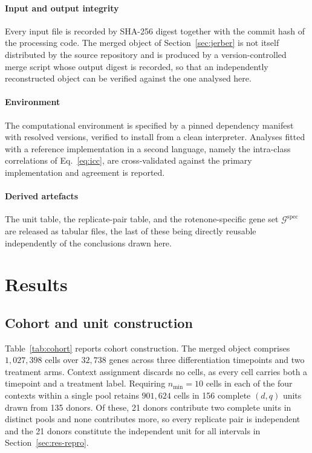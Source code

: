 \documentclass[5p,times,twocolumn]{elsarticle}
\begin{document}
\paragraph{\textbf{Input and output integrity}} Every input file is recorded by
SHA-256 digest together with the commit hash of the processing code. The merged
object of Section~\ref{sec:jerber} is not itself distributed by the source
repository and is produced by a version-controlled merge script whose output
digest is recorded, so that an independently reconstructed object can be
verified against the one analysed here.

\paragraph{\textbf{Environment}} The computational environment is specified by a
pinned dependency manifest with resolved versions, verified to install from a
clean interpreter. Analyses fitted with a reference implementation in a second
language, namely the intra-class correlations of Eq.~\eqref{eq:icc}, are
cross-validated against the primary implementation and agreement is reported.

\paragraph{\textbf{Derived artefacts}} The unit table, the replicate-pair table,
and the rotenone-specific gene set $\mathcal{G}^{\mathrm{spec}}$ are released as
tabular files, the last of these being directly reusable independently of the
conclusions drawn here.



\section{\textbf{Results}}
\label{sec:results}

\subsection{\textbf{Cohort and unit construction}}

Table~\ref{tab:cohort} reports cohort construction. The merged object comprises
$1{,}027{,}398$ cells over $32{,}738$ genes across three differentiation
timepoints and two treatment arms. Context assignment discards no cells, as
every cell carries both a timepoint and a treatment label. Requiring
$n_{\min}=10$ cells in each of the four contexts within a single pool retains
$901{,}624$ cells in 156 complete $(d,q)$ units drawn from 135 donors. Of
these, 21 donors contribute two complete units in distinct pools and none
contributes more, so every replicate pair is independent and the 21 donors
constitute the independent unit for all intervals in
Section~\ref{sec:res-repro}.
\end{document}
